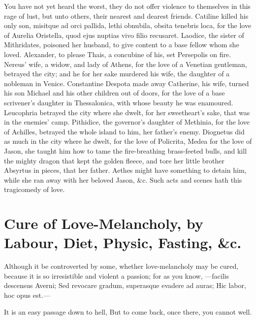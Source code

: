 {You have not yet heard the worst, they do not offer violence to
themselves in this rage of lust, but unto others, their nearest and
dearest friends. Catiline killed his only son, misitque ad orci
pallida, lethi obnubila, obsita tenebris loca, for the love of Aurelia
Oristella, quod ejus nuptias vivo filio recusaret. Laodice, the
sister of Mithridates, poisoned her husband, to give content to a base
fellow whom she loved. Alexander, to please Thais, a concubine of
his, set Persepolis on fire. Nereus' wife, a widow, and lady of
Athens, for the love of a Venetian gentleman, betrayed the city; and he
for her sake murdered his wife, the daughter of a nobleman in Venice.
Constantine Despota made away Catherine, his wife, turned his son
Michael and his other children out of doors, for the love of a base
scrivener's daughter in Thessalonica, with whose beauty he was
enamoured. Leucophria betrayed the city where she dwelt, for her
sweetheart's sake, that was in the enemies' camp. Pithidice, the
governor's daughter of Methinia, for the love of Achilles, betrayed the
whole island to him, her father's enemy. Diognetus did as much in
the city where he dwelt, for the love of Policrita, Medea for the love
of Jason, she taught him how to tame the fire-breathing brass-feeted
bulls, and kill the mighty dragon that kept the golden fleece, and tore
her little brother Absyrtus in pieces, that her father. Aethes might
have something to detain him, while she ran away with her beloved
Jason, \&c. Such acts and scenes hath this tragicomedy of love.


\section[Cure of Love-Melancholy]{Cure of Love-Melancholy, by Labour, Diet, Physic, Fasting, \&c.}

Although it be controverted by some, whether love-melancholy may be
cured, because it is so irresistible and violent a passion; for as you
know,
---facilis descensus Averni;
Sed revocare gradum, superasque evadere ad auras;
Hic labor, hoc opus est.---

It is an easy passage down to hell,
But to come back, once there, you cannot well.

}
